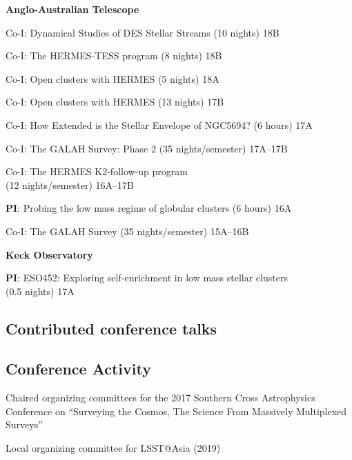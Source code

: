 \documentclass[10pt]{article}
\newcommand{\cvlist}{}
\begin{document}
\textbf{Anglo-Australian Telescope}
\begin{innerlist}
\item Co-I: Dynamical Studies of DES Stellar Streams (10 nights) \hfill{18B}
\item Co-I: The HERMES-TESS program (8 nights) \hfill{18B}
\item Co-I: Open clusters with HERMES (5 nights) \hfill{18A}
\item Co-I: Open clusters with HERMES (13 nights) \hfill{17B}
\item Co-I: How Extended is the Stellar Envelope of NGC5694? (6 hours) \hfill{17A}
\item Co-I: The GALAH Survey: Phase 2 (35 nights/semester) \hfill{17A--17B}
\item Co-I: The HERMES K2-follow-up program \\ (12 nights/semester)  \hfill{16A--17B}
\item \textbf{PI}: Probing the low mass regime of globular clusters (6 hours) \hfill{16A}
\item Co-I: The GALAH Survey (35 nights/semester) \hfill{15A--16B}
\end{innerlist}
\vspace{0.1in}
\textbf{Keck Observatory}
\begin{innerlist}
\item \textbf{PI}: ESO452: Exploring self-enrichment in low mass stellar clusters\\ (0.5 nights)  \hfill{17A}
\end{innerlist}

\subsection*{Contributed conference talks}
\begin{list}{}{\cvlist}

\end{list}
%
%

\subsection*{Conference Activity}
\begin{innerlist}
	\item Chaired organizing committees for the 2017 Southern Cross Astrophysics Conference on ``Surveying the Cosmos, The Science From Massively Multiplexed Surveys''
	\item Local organizing committee for LSST@Asia (2019)
\end{innerlist}
\end{document}
